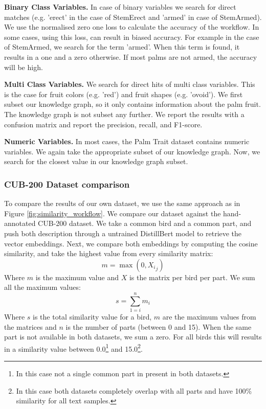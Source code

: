 \documentclass[a4paper, 12pt, oneside]{book} %
\begin{document}
\noindent
\textbf{Binary Class Variables.}
In case of binary variables we search for direct matches (e.g. 'erect' in the case of StemErect and 'armed' in case of StemArmed).
We use the normalised zero one loss \autocite{sammut_zero-one_2010} to calculate the accuracy of the workflow.
In some cases, using this loss, can result in biased accuracy.
For example in the case of StemArmed, we search for the term 'armed'. When this term is found, it results in a one and a zero otherwise. 
If most palms are not armed, the accuracy will be high.
\newline

\noindent
\textbf{Multi Class Variables.}
We search for direct hits of multi class variables.
This is the case for fruit colors (e.g. 'red') and fruit shapes (e.g. 'ovoid').
We first subset our knowledge graph, so it only contains information about the palm fruit. 
The knowledge graph is not subset any further.
We report the results with a confusion matrix and report the precision, recall, and F1-score.
\newline

\noindent
\textbf{Numeric Variables.}
In most cases, the Palm Trait dataset contains numeric variables.
We again take the appropriate subset of our knowledge graph.
Now, we search for the closest value in our knowledge graph subset.

\subsubsection{CUB-200 Dataset comparison}
To compare the results of our own dataset, we use the same approach as in Figure \ref{fig:similarity_workflow}.
We compare our dataset against the hand-annotated CUB-200 dataset.
We take a common bird and a common part, and push both description through a untrained DistillBert model to retrieve the vector embeddings.
Next, we compare both embeddings by computing the cosine similarity, and take the highest value from every similarity matrix:
\begin{equation}
    m=\max(0,  {X_i}_j  )
\end{equation}
Where $m$ is the maximum value and $X$ is the matrix per bird per part.
We sum all the maximum values:
\begin{equation}
     s=\sum_{1=i}^{n} m_i
\end{equation}
Where $s$ is the total similarity value for a bird, $m$ are the maximum values from the matrices and $n$ is the number of parts (between 0 and 15).
When the same part is not available in both datasets, we sum a zero.
For all birds this will results in a similarity value between 0.0\footnote{In this case not a single common part in present in both datasets.} and 15.0\footnote{In this case both datasets completely overlap with all parts and have 100\% similarity for all text samples.}.
\end{document}
